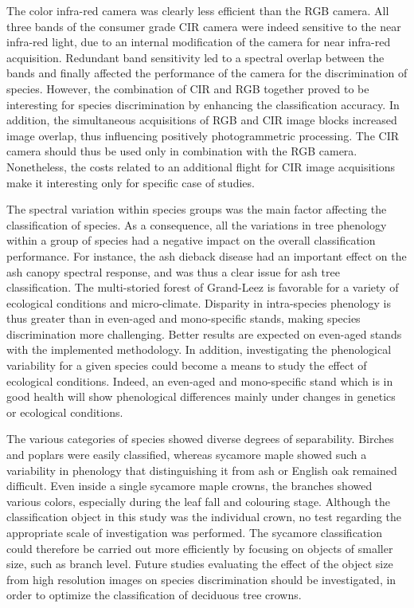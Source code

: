 \documentclass[remotesensing,article,submit,moreauthors,pdftex,12pt,a4paper]{mdpi} %
\begin{document}
The color infra-red camera was clearly less efficient than the RGB camera. 
All three bands of the consumer grade CIR camera were indeed sensitive to the near infra-red light, due to an internal modification of the camera for near infra-red acquisition. 
Redundant band sensitivity led to a spectral overlap between the bands and finally affected the performance of the camera for the discrimination of species. 
However, the combination of CIR and RGB together proved to be interesting for species discrimination by enhancing the classification accuracy.
In addition, the simultaneous acquisitions of RGB and CIR image blocks increased image overlap, thus influencing positively photogrammetric processing.
The CIR camera should thus be used only in combination with the RGB camera.
Nonetheless, the costs related to an additional flight for CIR image acquisitions make it interesting only for specific case of studies.

The spectral variation within species groups was the main factor affecting the classification of species. 
As a consequence, all the variations in tree phenology within a group of species had a negative impact on the overall classification performance. 
For instance, the ash dieback disease had an important effect on the ash canopy spectral response, and was thus a clear issue for ash tree classification. 
The multi-storied forest of Grand-Leez is favorable for a variety of ecological conditions and micro-climate. 
Disparity in intra-species phenology is thus greater than in even-aged and mono-specific stands, making species discrimination more challenging. 
Better results are expected on even-aged stands with the implemented methodology. 
In addition, investigating the phenological variability for a given species could become a means to study the effect of ecological conditions. 
Indeed, an even-aged and mono-specific stand which is in good health will show phenological differences mainly under changes in genetics or ecological conditions.

The various categories of species showed diverse degrees of separability. 
Birches and poplars were easily classified, whereas sycamore maple showed such a variability in phenology that distinguishing it from ash or English oak remained difficult. 
Even inside a single sycamore maple crowns, the branches showed various colors, especially during the leaf fall and colouring stage. 
Although the classification object in this study was the individual crown, no test regarding the appropriate scale of investigation  was performed. 
The sycamore classification could therefore be carried out more efficiently by focusing on objects of smaller size, such as branch level.
Future studies evaluating the effect of the object size from high resolution images on species discrimination should be investigated, in order to optimize the classification of deciduous tree crowns.
\end{document}
